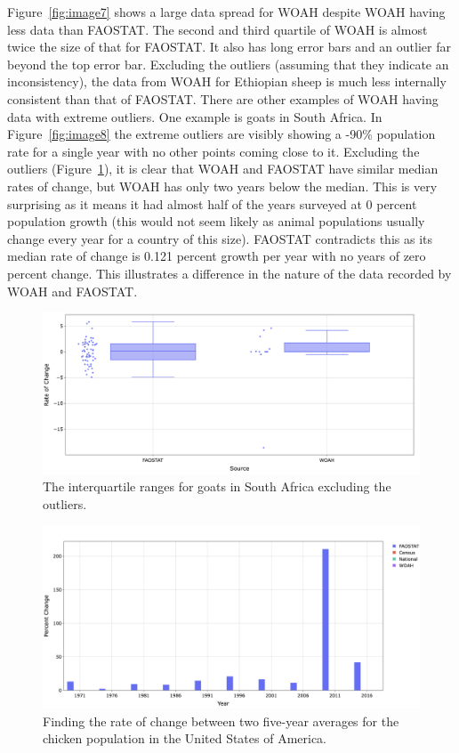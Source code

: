 \documentclass{article}
\begin{document}
Figure~\ref{fig:image7} shows a large data spread for WOAH despite WOAH having less data than FAOSTAT. The second and third quartile of WOAH is almost twice the size of that for FAOSTAT. It also has long error bars and an outlier far beyond the top error bar. Excluding the outliers (assuming that they indicate an inconsistency), the data from WOAH for Ethiopian sheep is much less internally consistent than that of FAOSTAT. There are other examples of WOAH having data with extreme outliers. One example is goats in South Africa. In Figure~\ref{fig:image8} the extreme outliers are visibly showing a -90\% population rate for a single year with no other points coming close to it. Excluding the outliers (Figure~\ref{fig:image9}), it is clear that WOAH and FAOSTAT have similar median rates of change, but WOAH has only two years below the median. This is very surprising as it means it had almost half of the years surveyed at 0 percent population growth (this would not seem likely as animal populations usually change every year for a country of this size). FAOSTAT contradicts this as its median rate of change is 0.121 percent growth per year with no years of zero percent change. This illustrates a difference in the nature of the data recorded by WOAH and FAOSTAT.

\begin{figure}[h!]
    \centering
    \includegraphics[width=1\textwidth]{image9}
    \caption{The interquartile ranges for goats in South Africa excluding the outliers.}
    \label{fig:image9}
\end{figure}

\begin{figure}[h!]
    \centering
    \includegraphics[width=1\textwidth]{image10}
    \caption{Finding the rate of change between two five-year averages for the chicken population in the United States of America.}
    \label{fig:image10} 
\end{figure}
\end{document}
